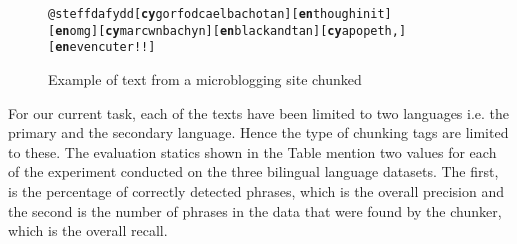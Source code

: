 \documentclass[11pt]{article}
\begin{document}
\begin{figure}
\begin{small}
\begin{alltt}
@steffdafydd [\textbf{cy} gorfod cael bach o tan] [\textbf{en} though init]
[\textbf{en} omg] [\textbf{cy} mar cwn bach yn] [\textbf{en} black and tan] [\textbf{cy} a popeth,] [\textbf{en} even cuter!!]
\end{alltt}
\end{small}
\label{fig:tweets}
\caption{Example of text from a microblogging site chunked}
\end{figure}

For our current task, each of the texts have been limited to two languages i.e. the primary and the secondary language. Hence the type of chunking tags are limited to these. The evaluation statics shown in the Table mention two values for each of the experiment conducted on the three bilingual language datasets. The first, is the percentage of correctly detected phrases, which is the overall precision and the second is the number of phrases in the data that were found by the chunker, which is the overall recall. \\
\end{document}
